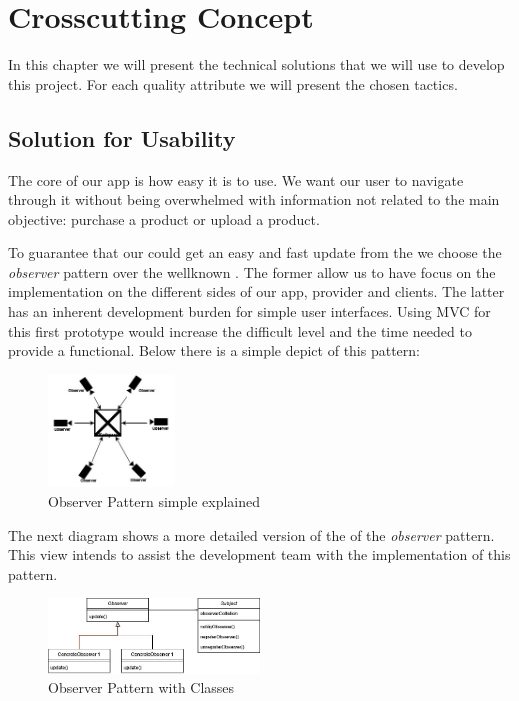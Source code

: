 \section{Crosscutting Concept} \label{Patterns_Tacticts}

In this chapter we will present the technical solutions that we will use to develop this project.
For each quality attribute we will present the chosen tactics.

\subsection{Solution for Usability}

The core of our app is how easy it is to use. We want our user to navigate through it without being overwhelmed with information
not related to the main objective: purchase a product or upload a product.

To guarantee that our  could get an easy and fast update from the  we choose 
the \textit{observer} pattern over the wellknown . The former allow us to have focus on the implementation
on the different sides of our app, provider and clients. The latter has an inherent development burden for simple user
interfaces. Using \gls{MVC} for this first prototype would increase the difficult level and the time needed to provide a 
functional. Below there is a simple depict of this pattern:

\begin{figure}[H]
    \centering
    \includegraphics[width=0.3\textwidth]{assets/observer.jpg}
    \caption{Observer Pattern simple explained}
    \label{fig:simple_observer}
\end{figure}

The next diagram shows a more detailed version of the of the \textit{observer} pattern. This view intends to assist the development
team with the implementation of this pattern.

\begin{figure}[H]
    \centering
    \includegraphics[width=0.5\textwidth]{assets/class_observer.jpg}
    \caption{Observer Pattern with Classes}
    \label{fig:class_observer}
\end{figure}

